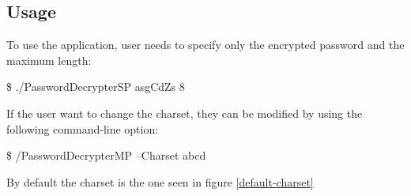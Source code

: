 \documentclass[10pt,twocolumn,letterpaper]{article}
\newenvironment{Shaded}{}{}
\newcommand{\ExtensionTok}[1]{#1}
\newcommand{\NormalTok}[1]{#1}
\begin{document}
\subsection{Usage}
To use the application, user needs to specify only the encrypted password and the maximum length:\\
\begin{Shaded}
\begin{Highlighting}[]
\NormalTok{\$ }\ExtensionTok{./PasswordDecrypterSP asgCdZs 8}
\end{Highlighting}
\end{Shaded}
If the user want to change the charset, they can be modified by using the following command-line option:\\
\begin{Shaded}
\begin{Highlighting}[]
\NormalTok{\$ }\ExtensionTok{/PasswordDecrypterMP --Charset abcd}
\end{Highlighting}
\end{Shaded}
By default the charset is the one seen in figure \ref{default-charset}
\end{document}
